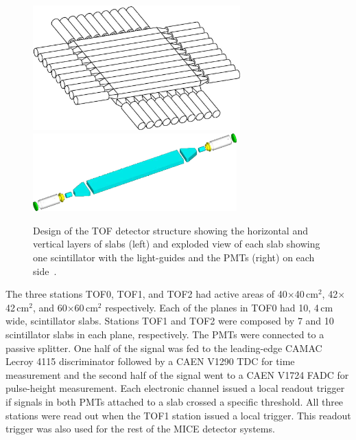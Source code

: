 
\begin{figure}[!htb]
  \centering
  \includegraphics[width=8cm]{tof_diagram2}
  \includegraphics[height=3cm]{slab_design2}
  \caption{Design of the TOF detector structure showing the horizontal and vertical layers of slabs (left) and exploded view of each slab showing one scintillator with the light-guides and the PMTs (right) on each side~\cite{NOTE145}.}
  \label{fig:tof:schematic}
\end{figure}

The three stations TOF0, TOF1, and TOF2 had active areas of
40$\times$40\,cm$^2$, 42$\times$42\,cm$^2$, and 60$\times$60\,cm$^2$
respectively.  Each of the planes in TOF0 had 10, 4\,cm wide, scintillator slabs.
Stations TOF1 and TOF2 were composed by 7 and 10 scintillator slabs in each plane, respectively.
The PMTs were connected to a passive splitter.
One half of the signal was fed to the leading-edge CAMAC Lecroy 4115 discriminator followed by a CAEN
V1290 TDC for time measurement and the second half of the signal went to a CAEN V1724 FADC for pulse-height measurement.
Each electronic channel issued a local readout trigger if signals in both PMTs attached to a
slab crossed a specific threshold. All three stations were read out when the TOF1 station issued a local trigger.
This readout trigger was also used for the rest of the MICE detector systems.


